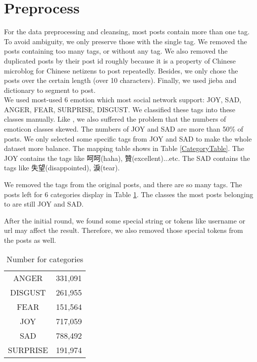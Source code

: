 \section{Preprocess}

For the data preprocessing and cleansing, most posts contain more than one tag. To avoid ambiguity, we only preserve those with the single tag.
We removed the posts containing too many tags, or without any tag. We also removed the duplicated posts by their post id roughly because it is a property of Chinese microblog \cite{fu2013reality} for Chinese netizens to post repeatedly. 
Besides, we only chose the posts over the certain length (over 10 characters). Finally, we used jieba and dictionary to segment to post. \\

We used most-used 6 emotion which most social network support: JOY, SAD, ANGER, FEAR, SURPRISE, DISGUST.
We classified these tags into these classes manually. 
Like \cite{zhao2012moodlens}, we also suffered the problem that the numbers of emoticon classes skewed. The numbers of JOY and SAD are more than 50\% of posts. 
We only selected some specific tags from JOY and SAD to make the whole dataset more balance.   
The mapping table shows in Table \ref{CategoryTable}. The JOY contains the tags like 呵呵(haha), 贊(excellent)...etc. 
The SAD contains the tags like 失望(disappointed), 淚(tear).


We removed the tags from the original posts, and there are so many tags. 
The posts left for 6 categories display in Table \ref{cat_num}. 
The classes the most posts belonging to are still JOY and SAD. 

After the initial round, we found some special string or tokens like username or url may affect the result. 
Therefore, we also removed those special tokens from the posts as well.

\begin{table}[]
\centering
\caption{Number for categories}
\label{cat_num}
\begin{tabular}{|c|c|}
\hline
ANGER      &331,091 \\                                                           
DISGUST    &261,955 \\                                                         
FEAR       &151,564 \\                                                         
JOY        &717,059 \\                                                           
SAD        &788,492 \\                                                           
SURPRISE   &191,974 \\
\hline
\end{tabular}
\end{table}


